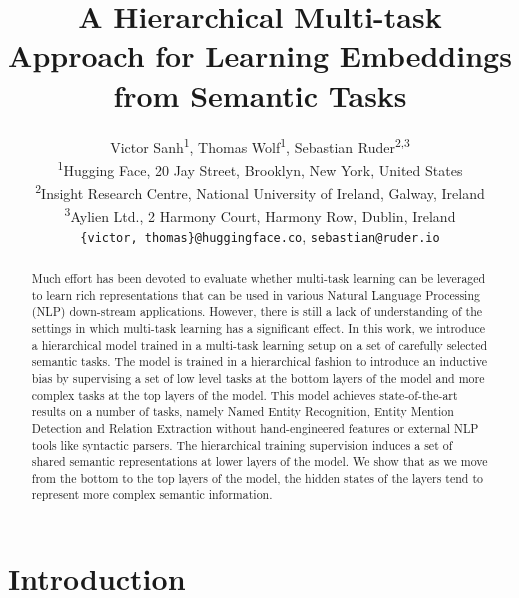 \documentclass[letterpaper]{article}
\begin{document}
\title{A Hierarchical Multi-task Approach for Learning Embeddings from Semantic Tasks}
\author{Victor Sanh\textsuperscript{1}, Thomas Wolf\textsuperscript{1}, Sebastian Ruder\textsuperscript{2,3}\\
\textsuperscript{1}{Hugging Face, 20 Jay Street, Brooklyn, New York, United States}\\
\textsuperscript{2}{Insight Research Centre, National University of Ireland, Galway, Ireland}\\
\textsuperscript{3}{Aylien Ltd., 2 Harmony Court, Harmony Row, Dublin, Ireland}\\
\texttt{\{victor, thomas\}@huggingface.co}, \texttt{sebastian@ruder.io}
}


\maketitle

\begin{abstract}
    Much effort has been devoted to evaluate whether multi-task learning can be leveraged to learn rich representations that can be used in various Natural Language Processing (NLP) down-stream applications. However, there is still a lack of understanding of the settings in which multi-task learning has a significant effect. In this work, we introduce a hierarchical model trained in a multi-task learning setup on a set of carefully selected semantic tasks. The model is trained in a hierarchical fashion to introduce an inductive bias by supervising a set of low level tasks at the bottom layers of the model and more complex tasks at the top layers of the model. This model achieves state-of-the-art results on a number of tasks, namely Named Entity Recognition, Entity Mention Detection and Relation Extraction without hand-engineered features or external NLP tools like syntactic parsers. The hierarchical training supervision induces a set of shared semantic representations at lower layers of the model. We show that as we move from the bottom to the top layers of the model, the hidden states of the layers tend to represent more complex semantic information.
\end{abstract}



\section{Introduction}
\end{document}
